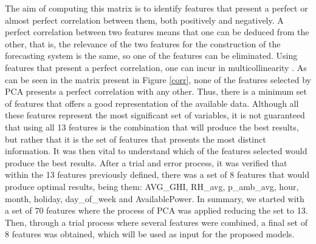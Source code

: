 The aim of computing this matrix is to identify features that present a perfect or almost perfect correlation between them, both positively and negatively. A perfect correlation between two features means that one can be deduced from the other, that is, the relevance of the two features for the construction of the forecasting system is the same, so one of the features can be eliminated. Using features that present a perfect correlation, one can incur in multicollinearity \cite{multicollinearity}. As can be seen in the matrix present in Figure \ref{corr}, none of the features selected by \ac{PCA} presents a perfect correlation with any other. Thus, there is a minimum set of features that offers a good representation of the available data. Although all these features represent the most significant set of variables, it is not guaranteed that using all 13 features is the combination that will produce the best results, but rather that it is the set of features that presents the most distinct information. It was then vital to understand which of the features selected would produce the best results. After a trial and error process, it was verified that within the 13 features previously defined, there was a set of 8 features that would produce optimal results, being them: AVG\_GHI, RH\_avg, p\_amb\_avg, hour, month, holiday, day\_of\_week and AvailablePower. 
In summary, we started with a set of 70 features where the process of \ac{PCA} was applied reducing the set to 13. Then, through a trial process where several features were combined, a final set of 8 features was obtained, which will be used as input for the proposed models.






